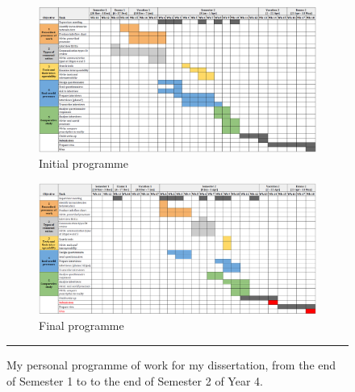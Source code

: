 

\begin{figure}[htbp]
    \centering
        \begin{subfigure}{.45\textwidth}
          \centering
          \includegraphics[width=\textwidth]{figures/DST-schedule-start.PNG}
          \caption{Initial programme}
          \label{DST_schedule01}
        \end{subfigure}
        \begin{subfigure}{.51\textwidth}
          \centering
          \includegraphics[width=\textwidth]{figures/DST-schedule-end-big.PNG}
          \caption{Final programme}
          \label{DST_schedule02}
        \end{subfigure}
    \rule{\textwidth}{0.5pt} %
    \caption[My personal programme of work for my dissertation.]{My personal programme of work for my dissertation, from the end of Semester 1 to to the end of Semester 2 of Year 4.}
    \label{DST_schedule}
\end{figure}


